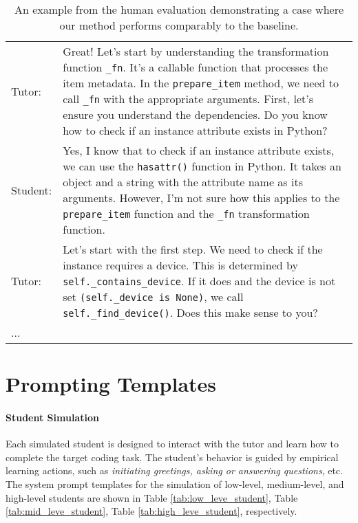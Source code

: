 \begin{table*}[th]
{\begin{tabular}{lp{16.5cm}}
Tutor:  &  Great! Let's start by understanding the transformation function \texttt{\_fn}. It's a callable function that processes the item metadata. In the \texttt{prepare\_item} method, we need to call \texttt{\_fn} with the appropriate arguments. First, let's ensure you understand the dependencies. Do you know how to check if an instance attribute exists in Python?  \\

Student:  &   Yes, I know that to check if an instance attribute exists, we can use the \texttt{hasattr()} function in Python. It takes an object and a string with the attribute name as its arguments. However, I'm not sure how this applies to the \texttt{prepare\_item} function and the \texttt{\_fn} transformation function. \\

Tutor:  &   Let's start with the first step. We need to check if the instance requires a device. This is determined by \texttt{self.\_contains\_device}. If it does and the device is not set \texttt{(self.\_device is None)}, we call \texttt{self.\_find\_device()}. Does this make sense to you?  \\

... &  \\

\bottomrule
\end{tabular}}
\caption{An example from the human evaluation demonstrating a case where our method performs comparably to the baseline.}
\label{tab:case_tie}
\end{table*}



\section{Prompting Templates}
\label{appendix:prompt}

\paragraph{Student Simulation}
\label{appendix:student}

Each simulated student is designed to interact with the tutor and learn how to complete the target coding task. The student's behavior is guided by empirical learning actions, such as \textit{initiating greetings, asking or answering questions}, etc. The system prompt templates for the simulation of low-level, medium-level, and high-level students are shown in Table \ref{tab:low_leve_student}, Table \ref{tab:mid_leve_student}, Table \ref{tab:high_leve_student}, respectively.


